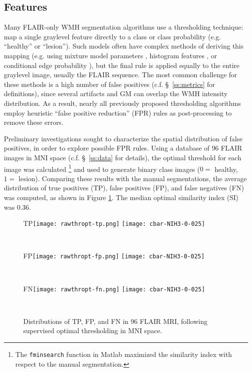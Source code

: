 \subsection{Features}
Many FLAIR-only WMH segmentation algorithms use a thresholding technique: map a single graylevel feature directly to a class or class probability (e.g. ``healthy'' or ``lesion''). Such models often have complex methods of deriving this mapping (e.g. using mixture model parameters \cite{Roura2015}, histogram features \cite{Yoo2014}, or conditional edge probability \cite{Knight2016}), but the final rule is applied equally to the entire graylevel image, usually the FLAIR sequence. The most common challenge for these methods is a high number of false positives (c.f. \S\ \ref{ss:metrics} for definitions), since several artifacts and GM can overlap the WMH intensity distribution. As a result, nearly all previously proposed thresholding algorithms employ heuristic ``false positive reduction'' (FPR) rules as post-processing to remove these errors.
\par
Preliminary investigations sought to characterize the spatial distribution of false positives, in order to explore possible FPR rules. Using a database of 96 FLAIR images in MNI space (c.f. \S\ \ref{ss:data} for details), the optimal threshold for each image was calculated%
\footnote{The \texttt{fminsearch} function in Matlab maximized the similarity index with respect to the manual segmentation.}
and used to generate binary class images ($0 =$ healthy, $1 =$ lesion). Comparing these results with the manual segmentations, the average distribution of true positives (TP), false positives (FP), and false negatives (FN) was computed, as shown in Figure \ref{fig:thropt-tpfpfn}. The median optimal similarity index (SI) was 0.36.
\begin{figure}[h]
  \centering
  \begin{subfigureside}{TP}\texttt{[image: rawthropt-tp.png]} \texttt{[image: cbar-NIH3-0-025]}\end{subfigureside}\\[0.5em]
  \begin{subfigureside}{FP}\texttt{[image: rawthropt-fp.png]} \texttt{[image: cbar-NIH3-0-025]}\end{subfigureside}\\[0.5em]
  \begin{subfigureside}{FN}\texttt{[image: rawthropt-fn.png]} \texttt{[image: cbar-NIH3-0-025]}\end{subfigureside}\\[0.5em]
  \caption{Distributions of TP, FP, and FN in 96 FLAIR MRI, following supervised optimal thresholding in MNI space.}
  \label{fig:thropt-tpfpfn}
\end{figure}
